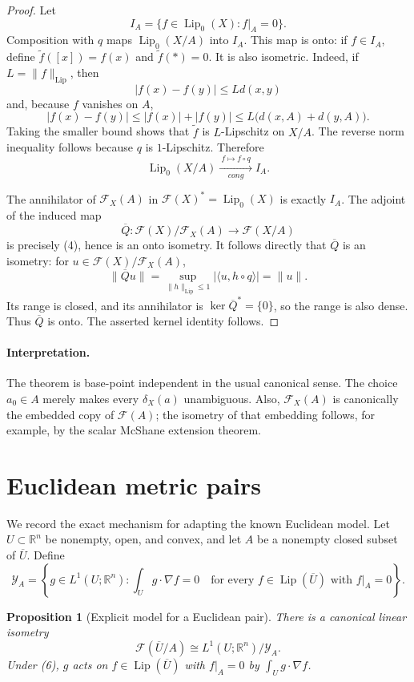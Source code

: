 \documentclass[11pt]{article}
\newtheorem{proposition}[theorem]{Proposition}
\newcommand{\F}{\mathcal F}
\newcommand{\Lip}{\operatorname{Lip}}
\newcommand{\Lipz}{\operatorname{Lip}_0}
\newcommand{\R}{\mathbb R}
\begin{document}
\begin{proof}
Let
\[
 I_A=\{f\in\Lipz(X): f|_A=0\}.
\]
Composition with $q$ maps $\Lipz(X/A)$ into $I_A$.  This map is onto: if
$f\in I_A$, define $\widetilde f([x])=f(x)$ and $\widetilde f(*)=0$.
It is also isometric.  Indeed, if $L=\|f\|_{\Lip}$, then
\[
 |f(x)-f(y)|\le Ld(x,y)
\]
and, because $f$ vanishes on $A$,
\[
 |f(x)-f(y)|\le |f(x)|+|f(y)|
 \le L\bigl(d(x,A)+d(y,A)\bigr).
\]
Taking the smaller bound shows that $\widetilde f$ is $L$-Lipschitz on
$X/A$.  The reverse norm inequality follows because $q$ is $1$-Lipschitz.
Therefore
\[
 \Lipz(X/A)\xrightarrow[cong]{\ f\mapsto f\circ q\ } I_A.    \tag{4}
\]

The annihilator of $\F_X(A)$ in $\F(X)^*=\Lipz(X)$ is exactly $I_A$.
The adjoint of the induced map
\[
 \overline Q:\F(X)/\F_X(A)\longrightarrow\F(X/A)
\]
is precisely (4), hence is an onto isometry.  It follows directly that
$\overline Q$ is an isometry: for $u\in\F(X)/\F_X(A)$,
\[
 \|\overline Qu\|
 =\sup_{\|h\|_{\Lip}\le1}|\langle u,h\circ q\rangle|=\|u\|.
\]
Its range is closed, and its annihilator is $\ker \overline Q^*=\{0\}$, so
the range is also dense.  Thus $\overline Q$ is onto.  The asserted kernel
identity follows.
\end{proof}

\paragraph{Interpretation.}
The theorem is base-point independent in the usual canonical sense.  The
choice $a_0\in A$ merely makes every $\delta_X(a)$ unambiguous.  Also,
$\F_X(A)$ is canonically the embedded copy of $\F(A)$; the isometry of that
embedding follows, for example, by the scalar McShane extension theorem.

\section*{Euclidean metric pairs}

We record the exact mechanism for adapting the known Euclidean model.  Let
$U\subset\R^n$ be nonempty, open, and convex, and let $A$ be a nonempty
closed subset of $\overline U$.  Define
\[
 \mathcal Y_A=
 \left\{g\in L^1(U;\R^n):
   \int_U g\cdot\nabla f=0
   \quad\text{for every }f\in\Lip(\overline U)\text{ with }f|_A=0
 \right\}.                                                     \tag{5}
\]

\begin{proposition}[Explicit model for a Euclidean pair]\label{prop:pair}
There is a canonical linear isometry
\[
 \F(\overline U/A)\cong L^1(U;\R^n)/\mathcal Y_A.              \tag{6}
\]
Under (6), $g$ acts on $f\in\Lip(\overline U)$ with $f|_A=0$ by
$\int_U g\cdot\nabla f$.
\end{proposition}
\end{document}
